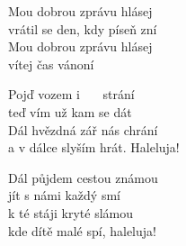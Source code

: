 
\cho{}
Mou dobrou zprávu hlásej\\
vrátil se den, kdy píseň zní \\
Mou dobrou zprávu hlásej\\
vítej čas vánoní

\ve{}
Pojď vozem i \ \ \ strání\\
teď vím už kam se dát\\
Dál hvězdná zář nás chrání\\
a v dálce slyším hrát. Haleluja! 

\cho{}

\ve{}
Dál půjdem cestou známou\\
jít s námi každý smí\\
k té stáji kryté slámou\\
kde dítě malé spí, haleluja!

\cho{}

\esong{}

